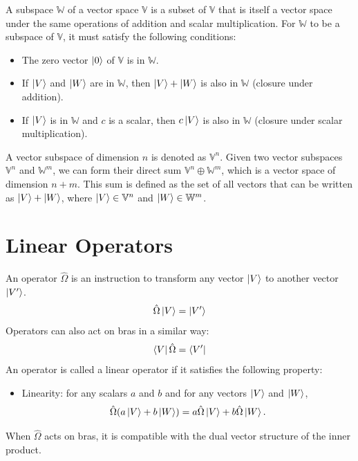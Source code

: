 \documentclass[12pt,a4paper]{report}
\newcommand{\vecspace}[1]{\mathbb{#1}}
\begin{document}
A subspace $\vecspace{W}$ of a vector space $\vecspace{V}$ is a subset of $\vecspace{V}$ that is itself a vector space under the same operations of addition and scalar multiplication. For $\vecspace{W}$ to be a subspace of $\vecspace{V}$, it must satisfy the following conditions:
\begin{itemize}
    \item The zero vector $\ket{0}$ of $\vecspace{V}$ is in $\vecspace{W}$.
    \item If $\ket{V}$ and $\ket{W}$ are in $\vecspace{W}$, then $\ket{V} + \ket{W}$ is also in $\vecspace{W}$ (closure under addition).
    \item If $\ket{V}$ is in $\vecspace{W}$ and $c$ is a scalar, then $c\ket{V}$ is also in $\vecspace{W}$ (closure under scalar multiplication).
\end{itemize}
A vector subspace of dimension $n$ is denoted as $\vecspace{V}^n$. Given two vector subspaces $\vecspace{V}^n$ and $\vecspace{W}^m$, we can form their direct sum $\vecspace{V}^n \oplus \vecspace{W}^m$, which is a vector space of dimension $n + m$. This sum is defined as the set of all vectors that can be written as $\ket{V} + \ket{W}$, where $\ket{V} \in \vecspace{V}^n$ and $\ket{W} \in \vecspace{W}^m$.
\section{Linear Operators}
An operator $\hat{\Omega}$ is an instruction to transform any vector $\ket{V}$ to another vector $\ket{V'}$.
\begin{equation*}
    \hat{\Omega} \ket{V} = \ket{V'}
\end{equation*}
Operators can also act on bras in a similar way:
\begin{equation*}
    \bra{V} \hat{\Omega} = \bra{V'}
\end{equation*}
An operator is called a linear operator if it satisfies the following property:
\begin{itemize}
    \item Linearity: for any scalars $a$ and $b$ and for any vectors $\ket{V}$ and $\ket{W}$,
    \begin{equation*}
        \hat{\Omega}(a\ket{V} + b\ket{W}) = a\hat{\Omega}\ket{V} + b\hat{\Omega}\ket{W}.
    \end{equation*}
\end{itemize}
When $\hat{\Omega}$ acts on bras, it is compatible with the dual vector structure of the inner product.
\end{document}
